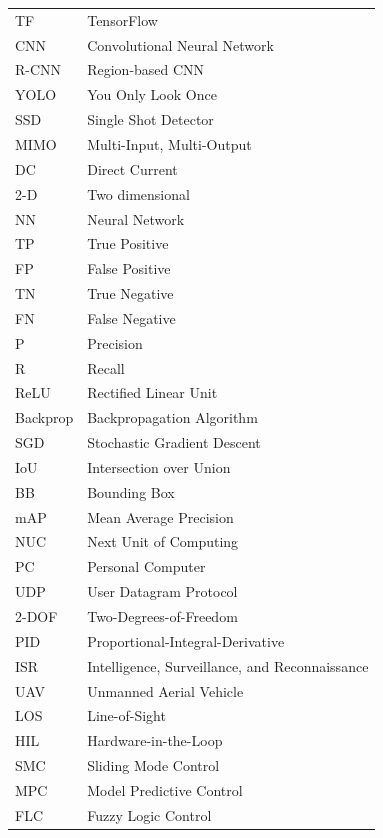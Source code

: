 \begin{longtable}{ll}
TF & TensorFlow \\
CNN & Convolutional Neural Network \\
R-CNN & Region-based CNN \\
YOLO & You Only Look Once \\
SSD & Single Shot Detector \\
MIMO & Multi-Input, Multi-Output \\
DC & Direct Current \\
2-D & Two dimensional \\
NN & Neural Network \\
TP & True Positive \\
FP & False Positive \\
TN & True Negative \\
FN & False Negative \\
P & Precision \\
R & Recall \\
ReLU & Rectified Linear Unit \\
Backprop & Backpropagation Algorithm \\
SGD & Stochastic Gradient Descent \\
IoU & Intersection over Union \\
BB & Bounding Box \\
mAP & Mean Average Precision \\
NUC & Next Unit of Computing \\
PC & Personal Computer \\
UDP & User Datagram Protocol \\
2-DOF & Two-Degrees-of-Freedom \\
PID & Proportional-Integral-Derivative \\
ISR & Intelligence, Surveillance, and Reconnaissance \\
UAV & Unmanned Aerial Vehicle \\
LOS & Line-of-Sight \\
HIL & Hardware-in-the-Loop \\
SMC & Sliding Mode Control \\
MPC & Model Predictive Control \\
FLC & Fuzzy Logic Control \\
\end{longtable}
